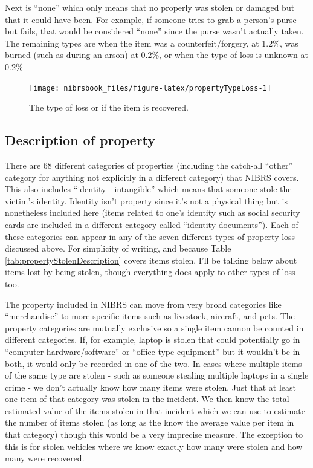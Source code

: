 \documentclass[
  12pt,
  openany]{book}
\begin{document}
Next is ``none'' which only means that no properly was stolen or damaged but that it could have been. For example, if someone tries to grab a person's purse but fails, that would be considered ``none'' since the purse wasn't actually taken. The remaining types are when the item was a counterfeit/forgery, at 1.2\%, was burned (such as during an arson) at 0.2\%, or when the type of loss is unknown at 0.2\%

\begin{figure}

{\centering \texttt{[image: nibrsbook\_files/figure-latex/propertyTypeLoss-1]} 

}

\caption{The type of loss or if the item is recovered.}\label{fig:propertyTypeLoss}
\end{figure}

\hypertarget{description-of-property}{%
\subsection{Description of property}\label{description-of-property}}

There are 68 different categories of properties (including the catch-all ``other'' category for anything not explicitly in a different category) that NIBRS covers. This also includes ``identity - intangible'' which means that someone stole the victim's identity. Identity isn't property since it's not a physical thing but is nonetheless included here (items related to one's identity such as social security cards are included in a different category called ``identity documents''). Each of these categories can appear in any of the seven different types of property loss discussed above. For simplicity of writing, and because Table \ref{tab:propertyStolenDescription} covers items stolen, I'll be talking below about items lost by being stolen, though everything does apply to other types of loss too.

The property included in NIBRS can move from very broad categories like ``merchandise'' to more specific items such as livestock, aircraft, and pets. The property categories are mutually exclusive so a single item cannon be counted in different categories. If, for example, laptop is stolen that could potentially go in ``computer hardware/software'' or ``office-type equipment'' but it wouldn't be in both, it would only be recorded in one of the two. In cases where multiple items of the same type are stolen - such as someone stealing multiple laptops in a single crime - we don't actually know how many items were stolen. Just that at least one item of that category was stolen in the incident. We then know the total estimated value of the items stolen in that incident which we can use to estimate the number of items stolen (as long as the know the average value per item in that category) though this would be a very imprecise measure. The exception to this is for stolen vehicles where we know exactly how many were stolen and how many were recovered.
\end{document}
